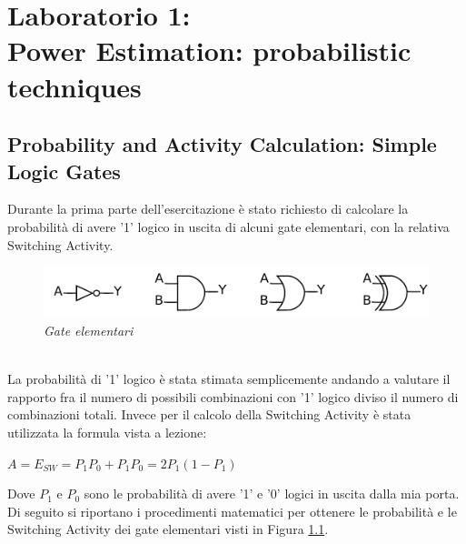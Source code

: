 \chapter{Laboratorio 1: \\Power Estimation: probabilistic techniques}
\section{Probability and Activity Calculation: Simple Logic Gates}
Durante la prima parte dell'esercitazione è stato richiesto di calcolare la probabilità di avere '1' logico in uscita di alcuni gate elementari, con la relativa Switching Activity.
\begin{figure}[!htb]
	\centering
	\includegraphics[scale=0.8]{immagini/gate}
	\caption{\textit{Gate elementari}}
	\label{fig1_1}
\end{figure} \\
La probabilità di '1' logico è stata stimata semplicemente andando a valutare il rapporto fra il numero di possibili combinazioni con '1' logico diviso il numero di combinazioni totali. Invece per il calcolo della Switching Activity è stata utilizzata la formula vista a lezione:
\begin{center}
	$ A=E_{SW}=P_{1}P_{0}+P_{1}P_{0}=2P_{1}(1-P_{1}) $
\end{center}
Dove $P_{1}$ e $P_{0}$ sono le probabilità di avere '1' e '0' logici in uscita dalla mia porta. \\
Di seguito si riportano i procedimenti matematici per ottenere le probabilità e le Switching Activity dei gate elementari visti in Figura \ref{fig1_1}.\\
